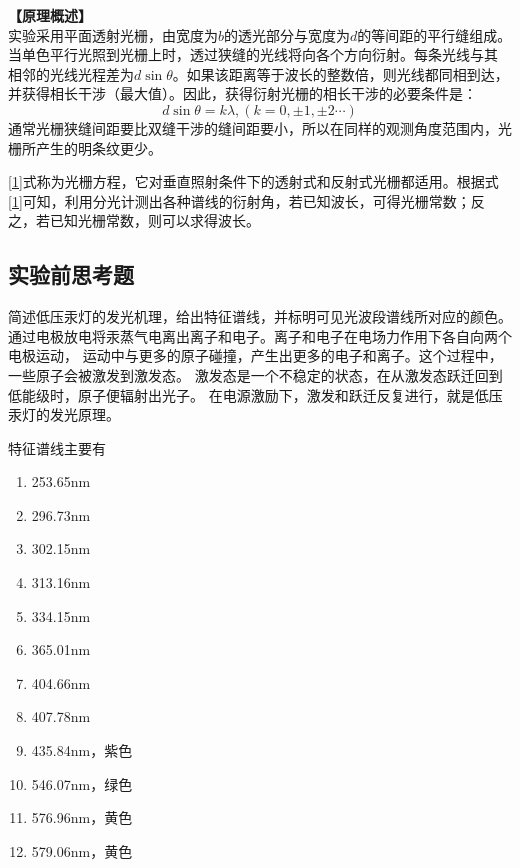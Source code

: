 \documentclass[dvipsnames, svgnames,a4paper,11pt]{article}
\begin{document}
\noindent\textbf{【原理概述】}\\
实验采用平面透射光栅，由宽度为$b$的透光部分与宽度为$d$的等间距的平行缝组成。当单色平行光照到光栅上时，透过狭缝的光线将向各个方向衍射。每条光线与其
相邻的光线光程差为$d\sin\theta$。如果该距离等于波长的整数倍，则光线都同相到达，并获得相长干涉（最大值）。因此，获得衍射光栅的相长干涉的必要条件是：
\begin{equation}
    d\sin\theta=k\lambda,(k=0,\pm1,\pm2\cdots)
    \label{1}
\end{equation}
通常光栅狭缝间距要比双缝干涉的缝间距要小，所以在同样的观测角度范围内，光栅所产生的明条纹更少。

\ref{1}式称为光栅方程，它对垂直照射条件下的透射式和反射式光栅都适用。根据式\ref{1}可知，利用分光计测出各种谱线的衍射角，若已知波长，可得光栅常数；反之，若已知光栅常数，则可以求得波长。\par
\subsection{实验前思考题}
\begin{question}
	简述低压汞灯的发光机理，给出特征谱线，并标明可见光波段谱线所对应的颜色。
	\tcblower
	通过电极放电将汞蒸气电离出离子和电子。离子和电子在电场力作用下各自向两个电极运动，
    运动中与更多的原子碰撞，产生出更多的电子和离子。这个过程中，一些原子会被激发到激发态。
    激发态是一个不稳定的状态，在从激发态跃迁回到低能级时，原子便辐射出光子。
    在电源激励下，激发和跃迁反复进行，就是低压汞灯的发光原理。

    特征谱线主要有\begin{enumerate}
        \item 253.65nm
        \item 296.73nm
        \item 302.15nm
        \item 313.16nm
        \item 334.15nm
        \item 365.01nm
        \item 404.66nm
        \item 407.78nm
        \item 435.84nm，紫色
        \item 546.07nm，绿色
        \item 576.96nm，黄色
        \item 579.06nm，黄色
    \end{enumerate}
\end{question}
\end{document}

